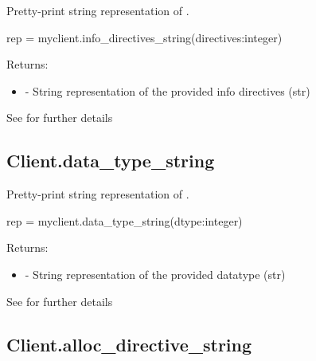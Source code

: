 \summary

Pretty-print string representation of .

\format

\pyspecificstart
\begin{codepar}
rep = myclient.info_directives_string(directives:integer)
\end{codepar}
\pyspecificend

\begin{arglist}
\end{arglist}

Returns:
\begin{itemize}
    \item {} - String representation of the provided info directives (str)
\end{itemize}

See  for further details


\subsection{Client.data_type_string}

\summary

Pretty-print string representation of .

\format

\pyspecificstart
\begin{codepar}
rep = myclient.data_type_string(dtype:integer)
\end{codepar}
\pyspecificend

\begin{arglist}
\end{arglist}

Returns:
\begin{itemize}
    \item {} - String representation of the provided datatype (str)
\end{itemize}

See  for further details


\subsection{Client.alloc_directive_string}

